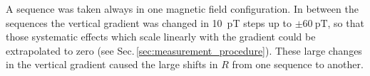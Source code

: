 


A sequence was taken always in one magnetic field configuration.
In between the sequences the vertical gradient was changed in \SI{10}{\pico\tesla} steps up to $\pm \SI{60}{\pico\tesla}$, so that those systematic effects which scale linearly with the gradient could be extrapolated to zero (see Sec.\,\ref{sec:measurement_procedure}). These large changes in the vertical gradient caused the large shifts in $R$ from one sequence to another.



